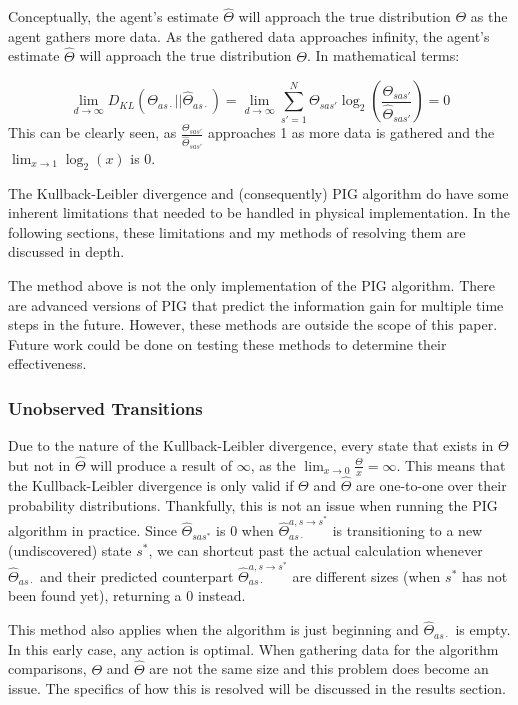 \documentclass[12pt]{thesis}
\begin{document}
Conceptually, the agent's estimate $\hat{\Theta}$ will approach the true distribution $\Theta$ as the agent gathers more data. As the gathered data approaches infinity, the agent's estimate $\hat{\Theta}$ will approach the true distribution $\Theta$. In mathematical terms:

\[ \lim_{d \rightarrow \infty} D_{KL}( \Theta_{as\cdot} || \hat{\Theta}_{as\cdot}) = \lim_{d \rightarrow \infty} \sum_{s' = 1}^{ N} \Theta_{sas'} \log_{2}(\frac{\Theta_{sas'}}{\hat{\Theta}_{sas'}}) = 0\]
This can be clearly seen, as $\frac{\Theta_{sas'}}{\hat{\Theta}_{sas'}}$ approaches 1 as more data is gathered and the $\lim_{x \rightarrow 1} \log_{2}(x)$ is 0.

The Kullback-Leibler divergence and (consequently) PIG algorithm do have some inherent limitations that needed to be handled in physical implementation. In the following sections, these limitations and my methods of resolving them are discussed in depth.

The method above is not the only implementation of the PIG algorithm. There are advanced versions of PIG that predict the information gain for multiple time steps in the future. However, these methods are outside the scope of this paper. Future work could be done on testing these methods to determine their effectiveness.

\subsubsection{Unobserved Transitions}
Due to the nature of the Kullback-Leibler divergence, every state that exists in $\Theta$ but not in $\hat{\Theta}$ will produce a result of $\infty$, as the $\lim_{x \rightarrow 0} \frac{\Theta}{x} = \infty$. This means that the Kullback-Leibler divergence is only valid if $\Theta$ and $\hat{\Theta}$ are one-to-one over their probability distributions. Thankfully, this is not an issue when running the PIG algorithm in practice. Since $\hat{\Theta}_{sas^{*}}$ is 0 when $\hat{\Theta}_{as\cdot}^{a,s \rightarrow s^{*}}$ is transitioning to a new (undiscovered) state $s^{*}$, we can shortcut past the actual calculation whenever  $\hat{\Theta}_{as\cdot}$ and their predicted counterpart $\hat{\Theta}_{as\cdot}^{a,s \rightarrow s^{*}}$ are different sizes (when $s^{*}$ has not been found yet), returning a 0 instead.

This method also applies when the algorithm is just beginning and $\hat{\Theta}_{as\cdot}$ is empty. In this early case, any action is optimal. When gathering data for the algorithm comparisons, $\Theta$ and $\hat{\Theta}$ are not the same size and this problem does become an issue. The specifics of how this is resolved will be discussed in the results section.
\end{document}
